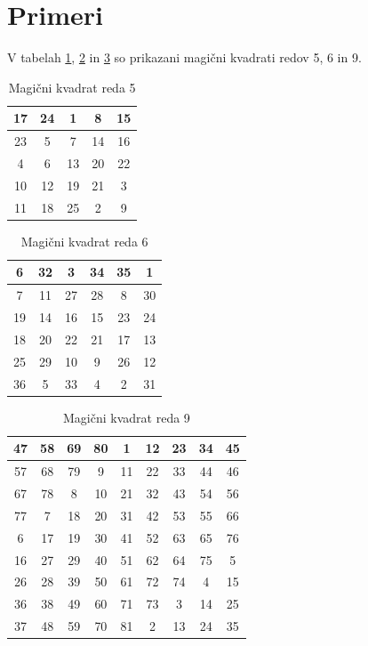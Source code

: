 \documentclass[a4paper,12pt]{article}
\newenvironment{magic}[3]
{
   \begin{table}[!ht]
      \centering
      \caption{#2}
      \label{#3}
      \large
      \begin{tabular}{#1}
         \hline 
}{
      \end{tabular}
      \normalsize
   \end{table}
}
\theoremstyle{definition}
\theoremstyle{definition}
\begin{document}
\section{Primeri}

V tabelah \ref{MKred5}, \ref{MKred6} in \ref{MKred9} so prikazani
magični kvadrati redov 5, 6 in 9.

\begin{magic}{|c|c|c|c|c|}{Magični kvadrat reda 5}{MKred5}
   
   17 & 24 &  1 &  8 & 15 \\\hline
   23 &  5 &  7 & 14 & 16 \\\hline
   4  &  6 & 13 & 20 & 22 \\\hline
   10 & 12 & 19 & 21 &  3 \\\hline
   11 & 18 & 25 &  2 &  9 \\\hline
\end{magic}

\begin{magic}{|c|c|c|c|c|c|}{Magični kvadrat reda 6}{MKred6}
   6  & 32 &  3 & 34 & 35 &  1 \\\hline
   7  & 11 & 27 & 28 &  8 & 30 \\\hline
   19 & 14 & 16 & 15 & 23 & 24 \\\hline
   18 & 20 & 22 & 21 & 17 & 13 \\\hline
   25 & 29 & 10 &  9 & 26 & 12 \\\hline
   36 &  5 & 33 &  4 &  2 & 31 \\\hline
\end{magic}

\begin{magic}{|c|c|c|c|c|c|c|c|c|}{Magični kvadrat reda 9}{MKred9}
47 & 58 & 69 & 80 &  1 & 12 & 23 & 34 & 45 \\\hline
57 & 68 & 79 &  9 & 11 & 22 & 33 & 44 & 46 \\\hline
67 & 78 &  8 & 10 & 21 & 32 & 43 & 54 & 56 \\\hline
77 &  7 & 18 & 20 & 31 & 42 & 53 & 55 & 66 \\\hline
6  & 17 & 19 & 30 & 41 & 52 & 63 & 65 & 76 \\\hline
16 & 27 & 29 & 40 & 51 & 62 & 64 & 75 &  5 \\\hline
26 & 28 & 39 & 50 & 61 & 72 & 74 &  4 & 15 \\\hline
36 & 38 & 49 & 60 & 71 & 73 &  3 & 14 & 25 \\\hline
37 & 48 & 59 & 70 & 81 &  2 & 13 & 24 & 35 \\\hline
\end{magic}



\end{document}
